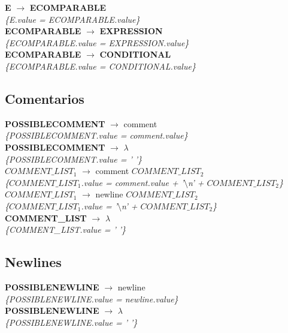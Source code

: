 \documentclass[10pt,a4paper]{article}
\begin{document}
\textbf{E} $\rightarrow$ \textbf{ECOMPARABLE}\\
\textit{\{E.value = ECOMPARABLE.value\}}\\

\textbf{ECOMPARABLE} $\rightarrow$ \textbf{EXPRESSION} \\
\textit{\{ECOMPARABLE.value = EXPRESSION.value\}} \\

\textbf{ECOMPARABLE} $\rightarrow$ \textbf{CONDITIONAL} \\
\textit{\{ECOMPARABLE.value = CONDITIONAL.value\}} \\


\subsection{Comentarios}

\textbf{POSSIBLECOMMENT} $\rightarrow$ comment \\
\textit{\{POSSIBLECOMMENT.value = comment.value\}} \\

\textbf{POSSIBLECOMMENT} $\rightarrow$ $\lambda$ \\
\textit{\{POSSIBLECOMMENT.value = ' '\}} \\

\textbf{$COMMENT\_LIST_{1}$} $\rightarrow$ comment \textbf{$COMMENT\_LIST_{2}$} \\
\textit{\{$COMMENT\_LIST_{1}$.value = comment.value + '$\setminus$n' + $COMMENT\_LIST_{2}$\}} \\

\textbf{$COMMENT\_LIST_{1}$} $\rightarrow$ newline \textbf{$COMMENT\_LIST_{2}$} \\
\textit{\{$COMMENT\_LIST_{1}$.value = '$\setminus$n' + $COMMENT\_LIST_{2}$\}} \\

\textbf{COMMENT\_LIST} $\rightarrow$ $\lambda$ \\
\textit{\{COMMENT\_LIST.value = ' '\}} \\

\subsection{Newlines}
\textbf{POSSIBLENEWLINE} $\rightarrow$ newline \\
\textit{\{POSSIBLENEWLINE.value = newline.value\}} \\

\textbf{POSSIBLENEWLINE} $\rightarrow$ $\lambda$ \\
\textit{\{POSSIBLENEWLINE.value = ' '\}} \\
\end{document}
